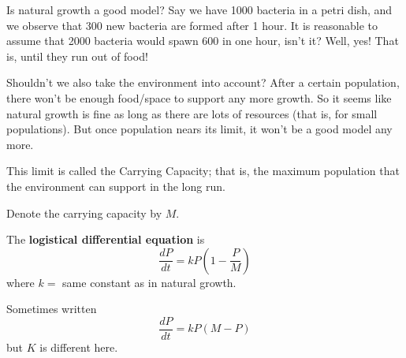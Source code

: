 Is natural growth a good model? Say we have 1000 bacteria in a petri
dish, and we observe that 300 new bacteria are formed after 1 hour.
It is reasonable to assume that 2000 bacteria would spawn 600 in one hour,
isn't it? Well, yes! That is, until they run out of food!

Shouldn't we also take the environment into account? After
a certain population, there won't be enough food/space to
support any more growth. So it seems like natural growth is fine
as long as there are lots of resources (that is, for small populations).
But once population nears its limit, it won't be a good model any more.

This limit is called the Carrying Capacity; that is, the maximum population
that the environment can support in the long run.

Denote the carrying capacity by $ M $.

\begin{Definition}{}{}
    The \textbf{logistical differential equation} is
    \[ \frac{dP}{dt}=kP\left( 1-\frac{P}{M}  \right) \]
    where $ k =$ same constant as in natural growth.
\end{Definition}
\begin{Remark}{}{}
    Sometimes written
    \[ \frac{dP}{dt}=kP(M-P)  \]
    but $ K $ is different here.
\end{Remark}

